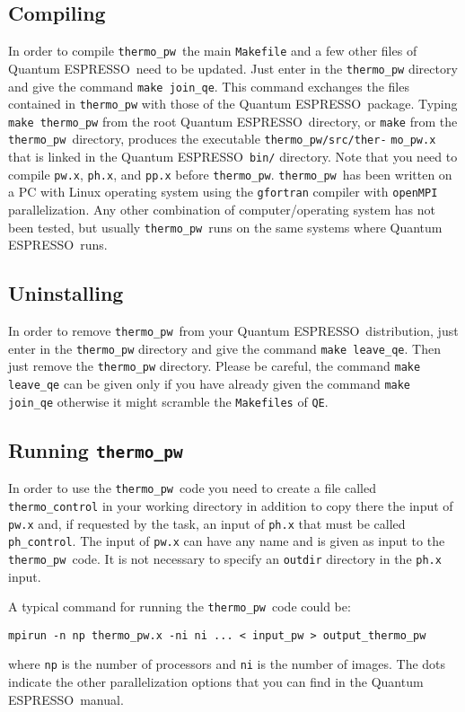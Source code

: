 \documentclass[12pt,a4paper]{article}
\def\qe{{\sc Quantum ESPRESSO}}
\def\thermo{\texttt{thermo\_pw}}
\begin{document}
\subsection{Compiling}

In order to compile \thermo\ the main \texttt{Makefile} and a few other
files of \qe\ need to be updated. Just enter in the \texttt{thermo\_pw}
directory and give the command \texttt{make join\_qe}. This command exchanges
the files contained in \texttt{thermo\_pw} with those of the \qe\ package.
Typing \texttt{make thermo\_pw} from the root \qe\ directory, or \texttt{make} 
from the \texttt{thermo\_pw}\ directory, produces the executable
\texttt{thermo\_pw/src/ther-} \texttt{mo\_pw.x} that is linked in the 
\qe\ \texttt{bin/} directory. Note that you need to compile \texttt{pw.x},
\texttt{ph.x}, and \texttt{pp.x} before \texttt{thermo\_pw}.
\thermo\ has been written on a PC with Linux operating system using the
\texttt{gfortran} compiler with \texttt{openMPI} parallelization. Any other
combination of computer/operating system has not been tested, but usually
\thermo\ runs on the same systems where \qe\ runs.

\subsection{Uninstalling}

In order to remove \thermo\ from your \qe\ distribution, just enter in the
\texttt{thermo\_pw} directory and give the command \texttt{make leave\_qe}.
Then just remove the \texttt{thermo\_pw} directory. Please be careful, the
command \texttt{make leave\_qe} can be given only if you have already
given the command \texttt{make join\_qe} otherwise it might scramble the
\texttt{Makefiles} of \texttt{QE}.

\subsection{Running \thermo}

In order to use the \thermo\ code you need to create a file called
\texttt{thermo\_control} in your working directory in addition to copy
there the input of \texttt{pw.x} and, if requested by the task, an
input of \texttt{ph.x} that must be called \texttt{ph\_control}.
The input of \texttt{pw.x} can have any name and is given as input to
the \thermo\ code. It is not necessary to specify an \texttt{outdir} 
directory in the \texttt{ph.x} input.

A typical command for running the \thermo\ code could be:
\begin{verbatim}
mpirun -n np thermo_pw.x -ni ni ... < input_pw > output_thermo_pw
\end{verbatim}
where \texttt{np} is the number of processors and \texttt{ni} is the number 
of images. The dots indicate the other parallelization options that
you can find in the \qe\ manual.
\end{document}
